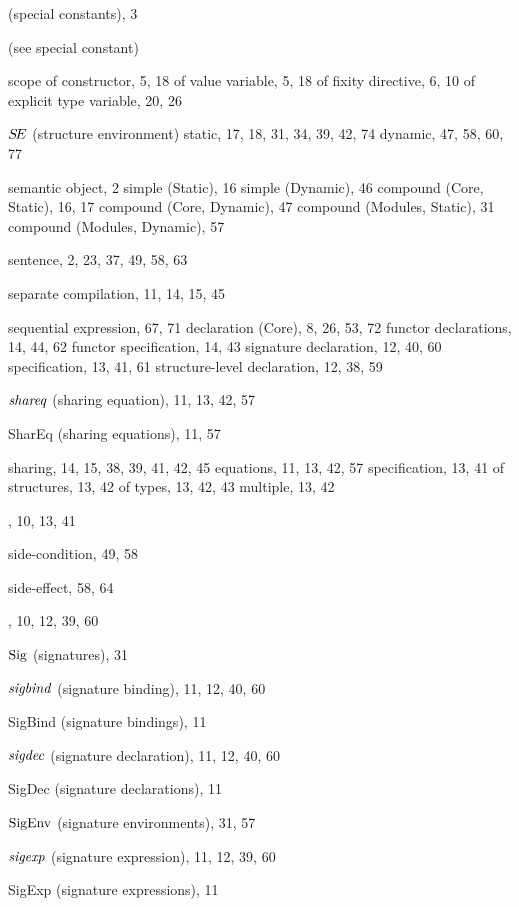 \begin{theindex}
\item {\SCon} (special constants), 3
\item {\scon} (see special constant) 
\item scope 
\subitem of constructor, 5, 18
\subitem of value variable, 5, 18
\subitem of fixity directive, 6, 10
\subitem of explicit type variable, 20, 26
\item $S\!E$ (structure environment) 
\subitem static, 17, 18, 31, 34, 39, 42, 74
\subitem dynamic, 47, 58, 60, 77
\item semantic object, 2
\subitem simple (Static), 16
\subitem simple (Dynamic), 46
\subitem compound (Core, Static), 16, 17
\subitem compound (Core, Dynamic), 47
\subitem compound (Modules, Static), 31
\subitem compound (Modules, Dynamic), 57
\item sentence, 2, 23, 37, 49, 58, 63
\item separate compilation, 11, 14, 15, 45
\item sequential 
\subitem expression, 67, 71
\subitem declaration (Core), 8, 26, 53, 72
\subitem functor declarations, 14, 44, 62
\subitem functor specification, 14, 43
\subitem signature declaration, 12, 40, 60
\subitem specification, 13, 41, 61
\subitem structure-level declaration, 12, 38, 59
\item ${\it shareq}$ (sharing equation), 11, 13, 42, 57
\item SharEq (sharing equations), 11, 57
\item sharing, 14, 15, 38, 39, 41, 42, 45
\subitem equations, 11, 13, 42, 57
\subitem specification, 13, 41
\subitem of structures, 13, 42
\subitem of types, 13, 42, 43
\subitem multiple, 13, 42
\item \SHARING, 10, 13, 41
\item side-condition, 49, 58
\item side-effect, 58, 64
\item \SIG, 10, 12, 39, 60
\item ${\rm Sig}$ (signatures), 31
\item ${\it sigbind}$ (signature binding), 11, 12, 40, 60
\item SigBind (signature bindings), 11
\item ${\it sigdec}$ (signature declaration), 11, 12, 40, 60
\item SigDec (signature declarations), 11
\item ${\rm SigEnv}$ (signature environments), 31, 57
\item ${\it sigexp}$ (signature expression), 11, 12, 39, 60
\item SigExp (signature expressions), 11

\end{theindex}
